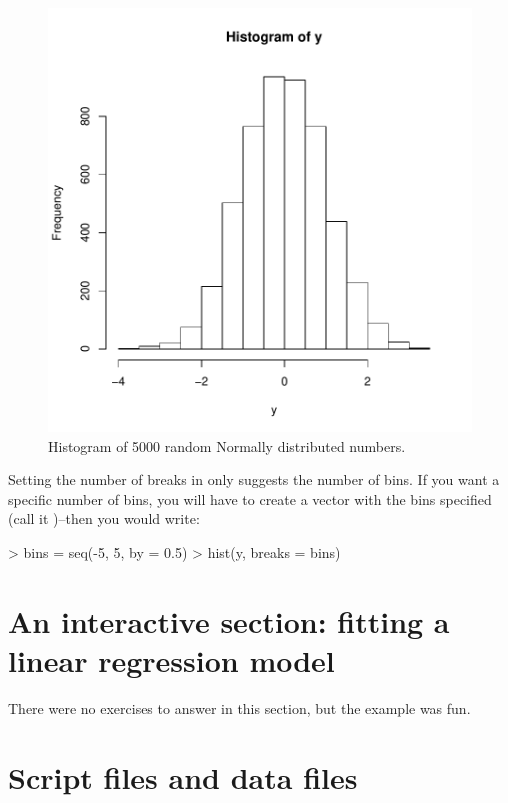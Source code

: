 \documentclass[11pt, oneside, reqno]{article}
\begin{document}
\begin{figure}
\begin{center}
\includegraphics{exercises-fig1}
\end{center}
\caption{Histogram of 5000 random Normally distributed numbers.}
\label{fig:one}
\end{figure}

Setting the number of breaks in \verb@hist@ only suggests the number of bins. If you want a specific number of bins, you will have to create a vector with the bins specified (call it \verb@bins@)--then you would write:

\begin{Schunk}
\begin{Sinput}
> bins = seq(-5, 5, by = 0.5)
> hist(y, breaks = bins)
\end{Sinput}
\end{Schunk}
\eans

\section{An interactive section: fitting a linear regression model}

There were no exercises to answer in this section, but the example was fun.

\section{Script files and data files}
\end{document}
